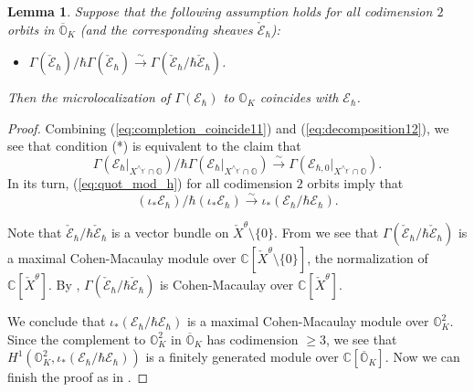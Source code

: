 \documentclass[12pt]{amsart}
\newcommand{\C}{\mathbb{C}}
\newcommand{\Orb}{\mathbb{O}}
\newtheorem{Lem}[Thm]{Lemma}
\theoremstyle{definition}
\numberwithin{equation}{section}
\begin{document}
\begin{Lem}\label{Lem:coh_extension2}
Suppose that the following assumption holds for all codimension $2$ orbits
in $\overline{\Orb}_K$ (and the corresponding sheaves $\check{\mathcal{E}}_\hbar$):
\begin{itemize}
\item[(*)] $\Gamma(\check{\mathcal{E}}_\hbar)/
\hbar \Gamma(\check{\mathcal{E}}_\hbar)\xrightarrow{\sim}\Gamma(\check{\mathcal{E}}_{\hbar}/\hbar \check{\mathcal{E}}_{\hbar})$.
\end{itemize}
Then the microlocalization of $\Gamma(\mathcal{E}_\hbar)$ to $\Orb_K$
coincides with $\mathcal{E}_\hbar$.
\end{Lem}
\begin{proof}
Combining (\ref{eq:completion_coincide11}) and (\ref{eq:decomposition12}), we see that condition (*) is equivalent to the claim that
\begin{equation}\label{eq:quot_mod_h}
\Gamma(\mathcal{E}_\hbar|_{X^{\wedge_{\chi'}}\cap \Orb})/
\hbar \Gamma(\mathcal{E}_\hbar|_{X^{\wedge_{\chi'}}\cap \Orb})\xrightarrow{\sim}
\Gamma(\mathcal{E}_{\hbar,0}|_{X^{\wedge_{\chi'}}\cap \Orb}).
\end{equation}
In its turn, (\ref{eq:quot_mod_h}) for all codimension $2$ orbits imply that
$$(\iota_*\mathcal{E}_\hbar)/\hbar (\iota_*\mathcal{E}_\hbar)
\xrightarrow{\sim} \iota_*(\mathcal{E}_\hbar/\hbar \mathcal{E}_\hbar).$$

Note that $\check{\mathcal{E}}_{\hbar}/\hbar \check{\mathcal{E}}_{\hbar}$ is a vector bundle
on $\check{X}^\theta\setminus\{0\}$. From \cite[Corollary 3.12]{Burban_Drozd} we see that
$\Gamma(\check{\mathcal{E}}_{\hbar}/\hbar \check{\mathcal{E}}_{\hbar})$ is a maximal Cohen-Macaulay
module over $\C[\check{X}^\theta\setminus\{0\}]$, the normalization of $\C[\check{X}^\theta]$.
By \cite[Lemma 2.24]{Burban_Drozd},  $\Gamma(\check{\mathcal{E}}_{\hbar}/\hbar \check{\mathcal{E}}_{\hbar})$ is Cohen-Macaulay over $\C[\check{X}^\theta]$.

We conclude that $\iota_*(\mathcal{E}_\hbar/\hbar \mathcal{E}_\hbar)$
is a maximal Cohen-Macaulay module over $\Orb_K^2$. Since the complement to
$\Orb_K^2$ in $\overline{\Orb}_K$ has codimension $\geqslant 3$, we see that
$H^1(\Orb_K^2, \iota_*(\mathcal{E}_\hbar/\hbar \mathcal{E}_\hbar))$
is a finitely generated module over $\C[\overline{\Orb}_K]$. Now we can
finish the proof as in \cite[Lemma 3.5]{HC_symp}.
\end{proof}
\end{document}
